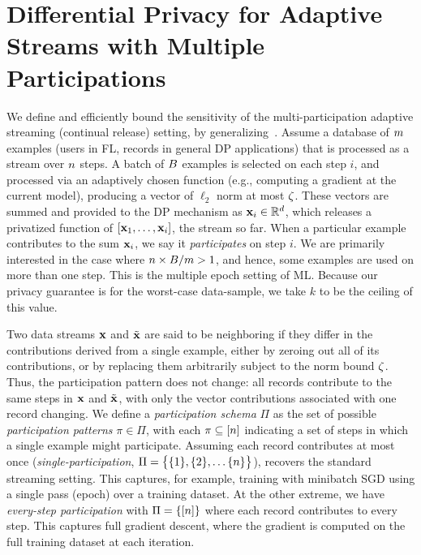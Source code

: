 \documentclass{article} %
\theoremstyle{named}
\begin{document}
\section{Differential Privacy for Adaptive Streams with Multiple Participations}
\label{sec:sensitivity}
We define and efficiently bound the sensitivity of the multi-participation adaptive streaming (continual release) setting, by generalizing~\citet[Sec. 2]{denisov22matfact}. Assume a database of $m$ examples (users in FL, records in general DP applications) that is processed as a stream over $n$ steps. A batch of $B$ examples is selected on each step $i$, and processed via an adaptively chosen function (e.g., computing a gradient at the current model), producing a vector of $\ell_2$ norm at most $\zeta$. These vectors are summed and provided to the DP mechanism as $\mathbf{x}_i \in \mathbb{R}^d$, which 
releases a privatized function of $[\mathbf{x}_1, \dots, \mathbf{x}_i]$, the stream so far. When a particular example contributes to the sum $\mathbf{x}_i$, we say it \emph{participates} on step $i$. We are primarily interested in the case where $n \times B / m > 1$, and hence, some examples are used on more than one step. This is the multiple epoch setting of ML. Because our privacy guarantee is for the worst-case data-sample, we take $k$ to be the ceiling of this value.

Two data streams $\mathbf{x}$ and $\tilde{\mathbf{x}}$ are said to be neighboring if they differ in the contributions derived from a single example, either by zeroing out all of its contributions, or by replacing them arbitrarily subject to the norm bound $\zeta$. Thus, the participation pattern does not change: all records contribute to the same steps in $\mathbf{x}$ and $\tilde{\mathbf{x}}$, with only the vector contributions associated with one record changing. We define a \emph{participation schema} $\Pi$ as the set of possible \emph{participation patterns} $\pi \in \Pi$, with each $\pi \subseteq [n]$ indicating a set of steps in which a single example might participate.
Assuming each record contributes at most once (\emph{single-participation}, $\Pi = \big\{ \{1\}, \{2\}, \dots \{n\}\big\}$), recovers the standard streaming setting. This captures, for example, training with minibatch SGD using a single pass (epoch) over a training dataset. 
At the other extreme, we have
\emph{every-step participation} with $\Pi = \{ [n]\}$ where each record contributes to every step. This captures full gradient descent, where the gradient is computed on the full training dataset at each iteration.  
\end{document}
